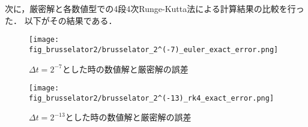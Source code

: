 次に，厳密解と各数値型での4段4次Runge-Kutta法による計算結果の比較を行った．
以下がその結果である．\\
\begin{figure}[H]
    \centering
    \begin{minipage}[b]{0.49\columnwidth}
        \centering
        \texttt{[image: fig\_brusselator2/brusselator\_2^(-7)\_euler\_exact\_error.png]}
        \caption{$\Delta t = 2^{-7}$とした時の数値解と厳密解の誤差}
        \label{fig:brusselator_2^(-7)_rk4_exact_error}
    \end{minipage}
    \begin{minipage}[b]{0.49\columnwidth}
        \centering
        \texttt{[image: fig\_brusselator2/brusselator\_2^(-13)\_rk4\_exact\_error.png]}
        \caption{$\Delta t =  2^{-13}$とした時の数値解と厳密解の誤差}
        \label{fig:brusselator_2^(-13)_exact_error}
    \end{minipage}
\end{figure}

